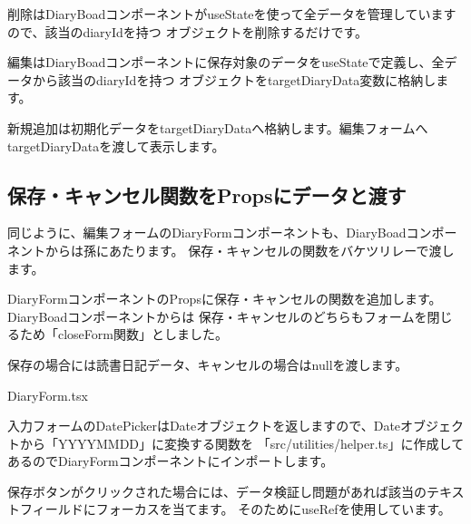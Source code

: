 削除はDiaryBoadコンポーネントがuseStateを使って全データを管理していますので、該当のdiaryIdを持つ
オブジェクトを削除するだけです。

\vspace*{\baselineskip}

編集はDiaryBoadコンポーネントに保存対象のデータをuseStateで定義し、全データから該当のdiaryIdを持つ
オブジェクトをtargetDiaryData変数に格納します。

\vspace*{\baselineskip}

新規追加は初期化データをtargetDiaryDataへ格納します。編集フォームへtargetDiaryDataを渡して表示します。

\subsection{保存・キャンセル関数をPropsにデータと渡す}
\keeplastskip{
  \label{sec:3-4-2}
  \label{sec-034-2}
  \par\nobreak
}

同じように、編集フォームのDiaryFormコンポーネントも、DiaryBoadコンポーネントからは孫にあたります。
保存・キャンセルの関数をバケツリレーで渡します。

DiaryFormコンポーネントのPropsに保存・キャンセルの関数を追加します。DiaryBoadコンポーネントからは
保存・キャンセルのどちらもフォームを閉じるため「closeForm関数」としました。

\vspace*{\baselineskip}

保存の場合には読書日記データ、キャンセルの場合はnullを渡します。

\def\startercodeblockfontsize{}
\begin{starterprogram}[]{DiaryForm.tsx}\end{starterprogram}

入力フォームのDatePickerはDateオブジェクトを返しますので、Dateオブジェクトから「YYYYMMDD」に変換する関数を
「src/utilities/helper.ts」に作成してあるのでDiaryFormコンポーネントにインポートします。

\vspace*{\baselineskip}

保存ボタンがクリックされた場合には、データ検証し問題があれば該当のテキストフィールドにフォーカスを当てます。
そのためにuseRefを使用しています。

\vspace*{\baselineskip}

